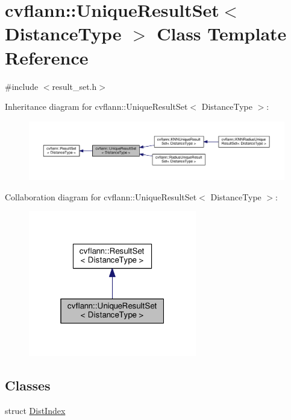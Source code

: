 \hypertarget{classcvflann_1_1UniqueResultSet}{\section{cvflann\-:\-:Unique\-Result\-Set$<$ Distance\-Type $>$ Class Template Reference}
\label{classcvflann_1_1UniqueResultSet}
}


{\ttfamily \#include $<$result\-\_\-set.\-h$>$}



Inheritance diagram for cvflann\-:\-:Unique\-Result\-Set$<$ Distance\-Type $>$\-:\nopagebreak
\begin{figure}[H]
\begin{center}
\leavevmode
\includegraphics[width=350pt]{classcvflann_1_1UniqueResultSet__inherit__graph}
\end{center}
\end{figure}


Collaboration diagram for cvflann\-:\-:Unique\-Result\-Set$<$ Distance\-Type $>$\-:\nopagebreak
\begin{figure}[H]
\begin{center}
\leavevmode
\includegraphics[width=208pt]{classcvflann_1_1UniqueResultSet__coll__graph}
\end{center}
\end{figure}
\subsection*{Classes}
\begin{DoxyCompactItemize}
\item 
struct \hyperlink{structcvflann_1_1UniqueResultSet_1_1DistIndex}{Dist\-Index}
\end{DoxyCompactItemize}
